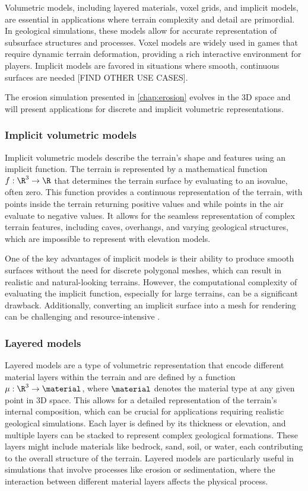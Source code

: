 Volumetric models, including layered materials, voxel grids, and implicit models, are essential in applications where terrain complexity and detail are primordial. In geological simulations, these models allow for accurate representation of subsurface structures and processes. Voxel models are widely used in games that require dynamic terrain deformation, providing a rich interactive environment for players. Implicit models are favored in situations where smooth, continuous surfaces are needed [FIND OTHER USE CASES].

The erosion simulation presented in \cref{chap:erosion} evolves in the 3D space and will present applications for discrete and implicit volumetric representations.

\subsubsection{Implicit volumetric models}
Implicit volumetric models describe the terrain's shape and features using an implicit function. The terrain is represented by a mathematical function $f: \R^3 \to \R$ that determines the terrain surface by evaluating to an isovalue, often zero. This function provides a continuous representation of the terrain, with points inside the terrain returning positive values and while points in the air evaluate to negative values. It allows for the seamless representation of complex terrain features, including caves, overhangs, and varying geological structures, which are impossible to represent with  elevation models.

One of the key advantages of implicit models is their ability to produce smooth surfaces without the need for discrete polygonal meshes, which can result in realistic and natural-looking terrains. However, the computational complexity of evaluating the implicit function, especially for large terrains, can be a significant drawback. Additionally, converting an implicit surface into a mesh for rendering can be challenging and resource-intensive \cite{Araujo2015}.

\subsubsection{Layered models}
Layered models are a type of volumetric representation that encode different material layers within the terrain and are defined by a function $\mu : \R^3 \to \material$, where $\material$ denotes the material type at any given point in 3D space. This allows for a detailed representation of the terrain's internal composition, which can be crucial for applications requiring realistic geological simulations. Each layer is defined by its thickness or elevation, and multiple layers can be stacked to represent complex geological formations. These layers might include materials like bedrock, sand, soil, or water, each contributing to the overall structure of the terrain. Layered models are particularly useful in simulations that involve processes like erosion or sedimentation, where the interaction between different material layers affects the physical process.

